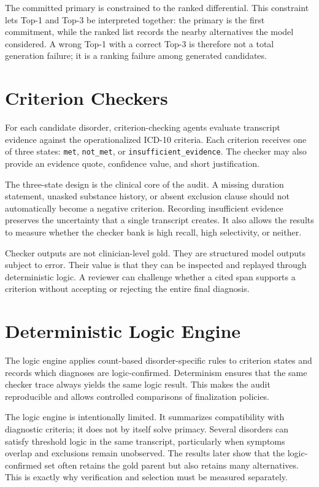 The committed primary is constrained to the ranked differential. This constraint lets Top-1 and Top-3 be interpreted together: the primary is the first commitment, while the ranked list records the nearby alternatives the model considered. A wrong Top-1 with a correct Top-3 is therefore not a total generation failure; it is a ranking failure among generated candidates.

\section{Criterion Checkers}

For each candidate disorder, criterion-checking agents evaluate transcript evidence against the operationalized ICD-10 criteria. Each criterion receives one of three states: \texttt{met}, \texttt{not\_met}, or \texttt{insufficient\_evidence}. The checker may also provide an evidence quote, confidence value, and short justification.

The three-state design is the clinical core of the audit. A missing duration statement, unasked substance history, or absent exclusion clause should not automatically become a negative criterion. Recording insufficient evidence preserves the uncertainty that a single transcript creates. It also allows the results to measure whether the checker bank is high recall, high selectivity, or neither.

Checker outputs are not clinician-level gold. They are structured model outputs subject to error. Their value is that they can be inspected and replayed through deterministic logic. A reviewer can challenge whether a cited span supports a criterion without accepting or rejecting the entire final diagnosis.

\section{Deterministic Logic Engine}

The logic engine applies count-based disorder-specific rules to criterion states and records which diagnoses are logic-confirmed. Determinism ensures that the same checker trace always yields the same logic result. This makes the audit reproducible and allows controlled comparisons of finalization policies.

The logic engine is intentionally limited. It summarizes compatibility with diagnostic criteria; it does not by itself solve primacy. Several disorders can satisfy threshold logic in the same transcript, particularly when symptoms overlap and exclusions remain unobserved. The results later show that the logic-confirmed set often retains the gold parent but also retains many alternatives. This is exactly why verification and selection must be measured separately.

